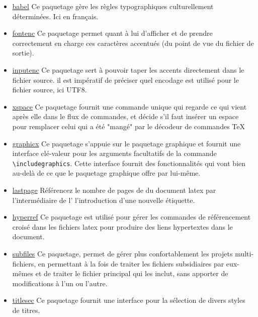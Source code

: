 \begin{itemize}
    \item \href{https://www.ctan.org/pkg/babel}{babel} Ce paquetage gère les règles
          typographiques culturellement déterminées. Ici en français.
    \item \href{https://ctan.org/pkg/fontenc}{fontenc} Ce paquetage permet quant à lui d’afficher et de
          prendre correctement en charge ces caractères accentués (du point de vue du fichier de sortie).
    \item \href{https://www.ctan.org/pkg/inputenc}{inputenc} Ce paquetage sert à pouvoir taper les accents
          directement dans le fichier source. il est impératif de préciser quel encodage est utilisé pour le fichier
          source, ici UTF8.
    \item \href{https://www.ctan.org/pkg/inputenc}{xspace} Ce paquetage fournit une commande unique qui regarde ce
          qui vient après elle dans le flux de commandes, et décide s'il faut insérer un espace pour remplacer
          celui qui a été "mangé" par le décodeur de commandes TeX
    \item \href{https://www.ctan.org/pkg/graphicx}{graphicx} Ce paquetage s'appuie sur
          le paquetage graphique et fournit une interface clé-valeur pour les arguments
          facultatifs de la commande \verb=\includegraphics=. Cette interface fournit des
          fonctionnalités qui vont bien au-delà de ce que le paquetage graphique offre par lui-même.
    \item \href{https://www.ctan.org/pkg/lastpage}{lastpage} Référencez le nombre de pages de du
          document \gls{latex} par l'intermédiaire de l'
          l'introduction d'une nouvelle étiquette.
    \item \href{https://www.ctan.org/pkg/hyperref}{hyperref} Ce paquetage est utilisé
          pour gérer les commandes de référencement croisé dans les fichiers
          \gls{latex} pour produire des liens hypertextes dans le document.
    \item \href{https://www.ctan.org/pkg/subfiles}{subfiles} Ce paquetage, permet de gérer plus confortablement les projets
          multi-fichiers, en permettant à la fois de traiter les fichiers subsidiaires par eux-mêmes et de traiter le
          fichier principal qui les inclut, sans apporter de modifications à l'un ou l'autre.
    \item \href{https://www.ctan.org/pkg/titlesec}{titlesec} Ce paquetage fournit une interface pour la sélection de
          divers styles de titres.

\end{itemize}
